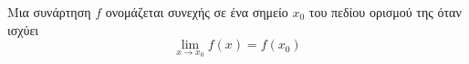 Μια συνάρτηση $ f $ ονομάζεται συνεχής σε ένα σημείο $ x_0 $ του πεδίου ορισμού της όταν ισχύει
\[ \lim_{x\to x_0}{f(x)}=f(x_0) \]
